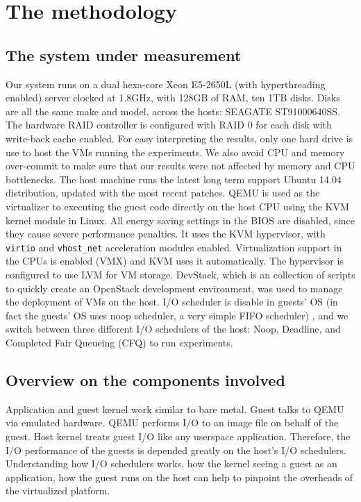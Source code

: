 \documentclass{acmsig}
\begin{document}

\section{The methodology}

\subsection{The system under measurement}

Our system runs on a dual hexa-core Xeon E5-2650L (with hyperthreading enabled) server clocked at 1.8GHz, with 128GB of RAM, ten 1TB disks. Disks are all the same make and model, across the hosts: SEAGATE ST91000640SS. The hardware RAID controller is configured with RAID 0 for each disk with write-back cache enabled. For easy interpreting the results, only one hard drive is use to host the VMs running the experiments. We also avoid  CPU and memory over-commit to make sure that our results were not affected by memory and CPU bottlenecks. The host machine runs the latest long term support Ubuntu 14.04 distribution, updated with the most recent patches. QEMU is used as the virtualizer to executing the guest code directly on the host CPU using the KVM kernel module in Linux. All energy saving settings in the BIOS are disabled, since they cause severe performance penalties. It uses the KVM hypervisor, with \texttt{virtio} and \texttt{vhost\_net} acceleration modules enabled. Virtualization support in the CPUs is enabled (VMX) and KVM uses it automatically. The hypervisor is configured to use LVM for VM storage. DevStack, which is an collection of scripts to quickly create an OpenStack development environment, was used to manage the deployment of VMs on the host. I/O scheduler is disable in guests' OS (in fact the guests' OS uses noop scheduler, a very simple FIFO scheduler) , and we switch between three different I/O schedulers of the host: Noop, Deadline, and Completed Fair Queueing (CFQ) to run experiments.
\subsection{Overview on the components involved}

  Application and guest kernel work similar to bare metal. Guest talks to QEMU via emulated hardware. QEMU performs I/O to an image file on behalf of the guest. Host kernel treats guest I/O like any userspace application. Therefore, the I/O performance of the guests is depended greatly on the host's I/O schedulers. Understanding how I/O schedulers works, how the kernel seeing a guest as an application, how the guest runs on the host can help to pinpoint the overheads of the virtualized platform.
\end{document}
